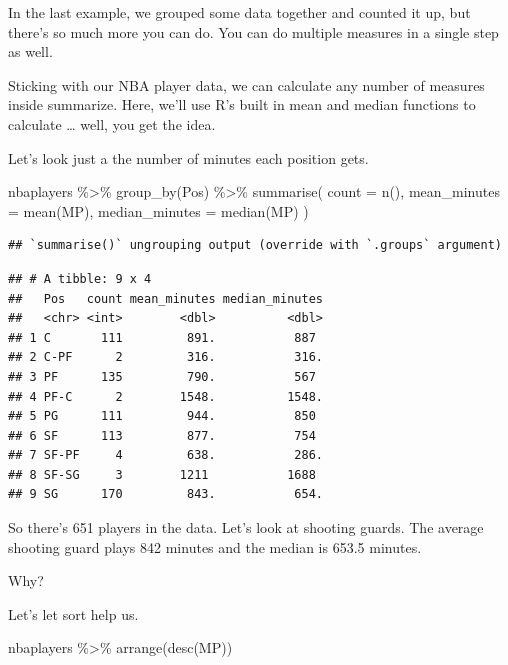 \documentclass[
]{book}
\newenvironment{Shaded}{\begin{snugshade}}{\end{snugshade}}
\newcommand{\AttributeTok}[1]{\textcolor[rgb]{0.77,0.63,0.00}{#1}}
\newcommand{\FunctionTok}[1]{\textcolor[rgb]{0.00,0.00,0.00}{#1}}
\newcommand{\NormalTok}[1]{#1}
\newcommand{\SpecialCharTok}[1]{\textcolor[rgb]{0.00,0.00,0.00}{#1}}
\begin{document}
In the last example, we grouped some data together and counted it up, but there's so much more you can do. You can do multiple measures in a single step as well.

Sticking with our NBA player data, we can calculate any number of measures inside summarize. Here, we'll use R's built in mean and median functions to calculate \ldots{} well, you get the idea.

Let's look just a the number of minutes each position gets.

\begin{Shaded}
\begin{Highlighting}[]
\NormalTok{nbaplayers }\SpecialCharTok{\%\textgreater{}\%}
  \FunctionTok{group\_by}\NormalTok{(Pos) }\SpecialCharTok{\%\textgreater{}\%}
  \FunctionTok{summarise}\NormalTok{(}
    \AttributeTok{count =} \FunctionTok{n}\NormalTok{(),}
    \AttributeTok{mean\_minutes =} \FunctionTok{mean}\NormalTok{(MP),}
    \AttributeTok{median\_minutes =} \FunctionTok{median}\NormalTok{(MP)}
\NormalTok{  )}
\end{Highlighting}
\end{Shaded}

\begin{verbatim}
## `summarise()` ungrouping output (override with `.groups` argument)
\end{verbatim}

\begin{verbatim}
## # A tibble: 9 x 4
##   Pos   count mean_minutes median_minutes
##   <chr> <int>        <dbl>          <dbl>
## 1 C       111         891.           887 
## 2 C-PF      2         316.           316.
## 3 PF      135         790.           567 
## 4 PF-C      2        1548.          1548.
## 5 PG      111         944.           850 
## 6 SF      113         877.           754 
## 7 SF-PF     4         638.           286.
## 8 SF-SG     3        1211           1688 
## 9 SG      170         843.           654.
\end{verbatim}

So there's 651 players in the data. Let's look at shooting guards. The average shooting guard plays 842 minutes and the median is 653.5 minutes.

Why?

Let's let sort help us.

\begin{Shaded}
\begin{Highlighting}[]
\NormalTok{nbaplayers }\SpecialCharTok{\%\textgreater{}\%} \FunctionTok{arrange}\NormalTok{(}\FunctionTok{desc}\NormalTok{(MP))}
\end{Highlighting}
\end{Shaded}
\end{document}
